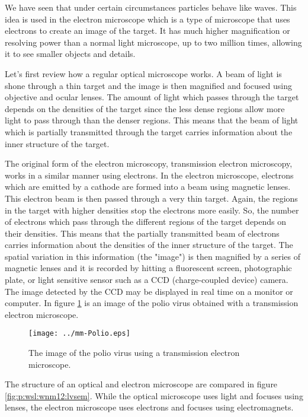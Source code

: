 We have seen that under certain circumstances particles behave like waves. This idea is used in the electron microscope which is a type of microscope that uses electrons to create an image of the target. It has much higher magnification or resolving power than a normal light microscope, up to two million times, allowing it to see smaller objects and details.


Let's first review how a regular optical microscope works.  A beam of light is shone through a thin target and the image is then magnified and focused using objective and ocular lenses. The amount of light  which passes through the target depends on the densities of the target since the less dense regions allow more light to pass through than the denser regions. This means that the beam of light which is partially transmitted through the target carries information about the inner structure of the target. 

The original form of the electron microscopy, transmission electron microscopy, works in a similar manner using electrons. In the electron microscope, electrons which are emitted by a cathode are formed into a beam using magnetic lenses. This electron beam is then passed through a very thin target. Again, the regions in the target with higher densities stop the electrons more easily. So, the number of electrons which pass through the different regions of the target depends on their densities. This means that the partially transmitted beam of electrons carries information about the densities of the inner structure of the target. The spatial variation in this information (the "image") is then magnified by a series of magnetic lenses and it is recorded by hitting a fluorescent screen, photographic plate, or light sensitive sensor such as a CCD (charge-coupled device) camera. The image detected by the CCD may be displayed in real time on a monitor or computer. In figure \ref{fig:polio} is an image of the polio virus obtained with a transmission electron microscope.

\begin{figure}[H]
\begin{center}
\texttt{[image: ../mm-Polio.eps]}
\caption{The image of the polio virus using a transmission electron microscope.}
\label{fig:polio}
\end{center}
\end{figure}

The structure of an optical and electron microscope are compared in figure \ref{fig:p:wsl:wnm12:lvsem}. While the optical microscope uses light and focuses using lenses, the electron microscope uses electrons and focuses using electromagnets.


